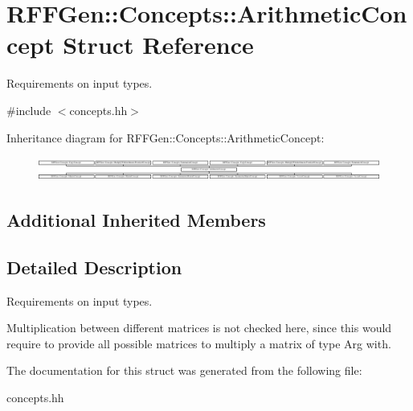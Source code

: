 \hypertarget{structRFFGen_1_1Concepts_1_1ArithmeticConcept}{\section{R\-F\-F\-Gen\-:\-:Concepts\-:\-:Arithmetic\-Concept Struct Reference}
\label{structRFFGen_1_1Concepts_1_1ArithmeticConcept}
}


Requirements on input types.  




{\ttfamily \#include $<$concepts.\-hh$>$}

Inheritance diagram for R\-F\-F\-Gen\-:\-:Concepts\-:\-:Arithmetic\-Concept\-:\begin{figure}[H]
\begin{center}
\leavevmode
\includegraphics[height=0.793201cm]{structRFFGen_1_1Concepts_1_1ArithmeticConcept}
\end{center}
\end{figure}
\subsection*{Additional Inherited Members}


\subsection{Detailed Description}
Requirements on input types. 

Multiplication between different matrices is not checked here, since this would require to provide all possible matrices to multiply a matrix of type Arg with. 

The documentation for this struct was generated from the following file\-:\begin{DoxyCompactItemize}
\item 
concepts.\-hh\end{DoxyCompactItemize}
